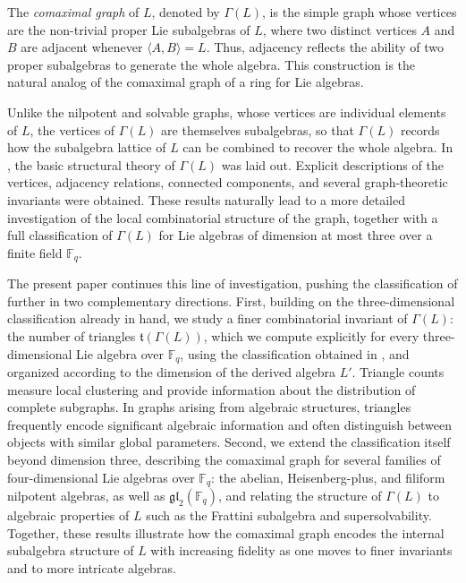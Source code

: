 \documentclass[11pt]{amsart}
\theoremstyle{plain}
\def\F{\mathbb{F}}
\begin{document}
The \emph{comaximal graph} of $L$, denoted by $\Gamma(L)$, is the simple graph whose vertices are the non-trivial proper Lie subalgebras of $L$, where two
distinct vertices $A$ and $B$ are adjacent whenever $\langle A, B\rangle = L$.
Thus, adjacency reflects the ability of two proper subalgebras to generate
the whole algebra. This construction is the natural analog of the comaximal graph of a ring for Lie algebras.

Unlike the nilpotent and solvable graphs, whose vertices are individual
elements of $L$, the vertices of $\Gamma(L)$ are themselves subalgebras, so
that $\Gamma(L)$ records how the subalgebra lattice of $L$ can be combined
to recover the whole algebra. In \cite{TZG}, the basic structural theory
of $\Gamma(L)$ was laid out. Explicit descriptions of the vertices, adjacency relations, connected components, and several graph-theoretic invariants were obtained. These results naturally lead to a more detailed investigation of the
local combinatorial structure of the graph, together with a full classification of $\Gamma(L)$ for Lie algebras of dimension at most three over a finite field $\F_q$.

The present paper continues this line of investigation, pushing the classification of \cite{TZG} further in two complementary directions. First, building on the three-dimensional classification already in hand, we study a finer combinatorial invariant of $\Gamma(L)$: the number of triangles $\mathfrak{t}(\Gamma(L))$, which we compute explicitly for every three-dimensional Lie algebra over $\F_q$, using the classification obtained in \cite{TZG}, and organized according to the dimension of the derived algebra $L'$. Triangle counts measure local clustering and provide information about the distribution of complete subgraphs. In graphs arising from algebraic structures, triangles frequently encode significant algebraic information and often distinguish between objects with similar global parameters. Second, we extend the classification itself beyond dimension three, describing the comaximal graph for several families of four-dimensional Lie algebras over $\F_q$: the abelian, Heisenberg-plus, and filiform nilpotent algebras, as well as
$\mathfrak{gl}_2(\F_q)$, and relating the structure of $\Gamma(L)$ to algebraic properties of $L$ such as the Frattini subalgebra and supersolvability. Together, these results illustrate how the comaximal graph encodes the internal subalgebra structure of $L$ with increasing fidelity as one moves to finer invariants and to
more intricate algebras.
\end{document}
